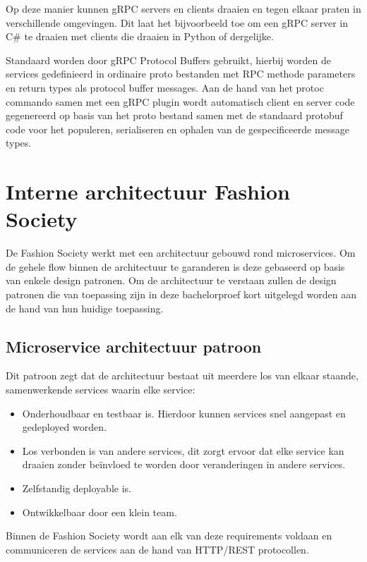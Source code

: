 Op deze manier kunnen gRPC servers en clients draaien en tegen elkaar praten in verschillende omgevingen. Dit laat het bijvoorbeeld toe om een gRPC server in C\# te draaien met clients die draaien in Python of dergelijke.

Standaard worden door gRPC Protocol Buffers gebruikt, hierbij worden de services gedefinieerd in ordinaire proto bestanden met RPC methode parameters en return types als protocol buffer messages. Aan de hand van het protoc commando samen met een gRPC plugin wordt automatisch client en server code gegenereerd op basis van het proto bestand samen met de standaard protobuf code voor het populeren, serialiseren en ophalen van de gespecificeerde message types.

\section{Interne architectuur Fashion Society}

De Fashion Society werkt met een architectuur gebouwd rond microservices. Om de gehele flow binnen de architectuur te garanderen is deze gebaseerd op basis van enkele design patronen. Om de architectuur te verstaan zullen de design patronen die van toepassing zijn in deze bachelorproef kort uitgelegd worden aan de hand van hun huidige toepassing.

\subsection{Microservice architectuur patroon}
\label{subsec:Microservice architectuur patroon}

Dit patroon zegt dat de architectuur bestaat uit meerdere los van elkaar staande, samenwerkende services waarin elke service:
 \begin{itemize}
     \item Onderhoudbaar en testbaar is. Hierdoor kunnen services snel aangepast en gedeployed worden.
     \item Los verbonden is van andere services, dit zorgt ervoor dat elke service kan draaien zonder beïnvloed te worden door veranderingen in andere services.
     \item Zelfstandig deployable is.
     \item Ontwikkelbaar door een klein team.
 \end{itemize}
\autocite{Richardsonc}

Binnen de Fashion Society wordt aan elk van deze requirements voldaan en communiceren de services aan de hand van HTTP/REST protocollen.

